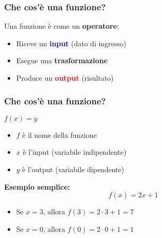 \documentclass[aspectratio=169]{beamer}
\begin{document}
\begin{frame}
\frametitle{Che cos'è una funzione?}
\begin{center}
\Large
Una funzione è come un \textbf{operatore}:\\[0.5cm]
\end{center}

\vspace{0.5cm}
\begin{itemize}
\item Riceve un \textcolor{blue}{\textbf{input}} (dato di ingresso)
\item Esegue una \textbf{trasformazione}
\item Produce un \textcolor{red}{\textbf{output}} (risultato)
\end{itemize}
\end{frame}
%
%
\begin{frame}
\frametitle{Che cos'è una funzione?}

\begin{center}
\Large
$f(x) = y$
\end{center}

\vspace{0.5cm}
\begin{itemize}
\item \textbf{$f$} è il nome della funzione
\item \textbf{$x$} è l'input (variabile indipendente)
\item \textbf{$y$} è l'output (variabile dipendente)
\end{itemize}

\vspace{0.5cm}
\textbf{Esempio semplice:}
$$f(x) = 2x + 1$$

\begin{itemize}
\item Se $x = 3$, allora $f(3) = 2 \cdot 3 + 1 = 7$
\item Se $x = 0$, allora $f(0) = 2 \cdot 0 + 1 = 1$
\end{itemize}
\end{frame}
%
\end{document}
